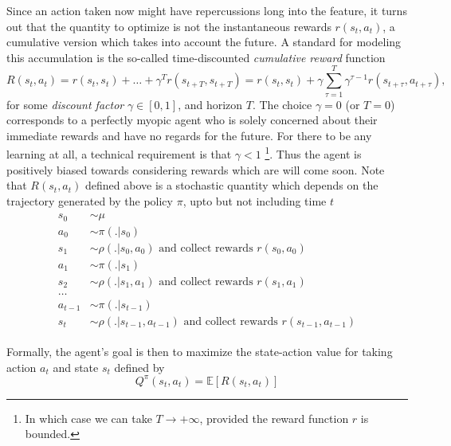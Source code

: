 \documentclass{article} %
\begin{document}
Since an action taken now might have repercussions long into the feature, it turns out that the
quantity to optimize is not the instantaneous rewards $r(s_t, a_t)$, a cumulative version which
takes into account the future. A standard for modeling this accumulation is the so-called
time-discounted \textit{cumulative reward} function
\begin{equation}
  \label{eq:cumr}
  R(s_t, a_t) = r(s_t, s_t) + \ldots + \gamma^Tr(s_{t+T}, s_{t+T})
  = r(s_t, s_t) + \gamma \sum_{\tau=1}^{T}\gamma^{\tau-1}r(s_{t+\tau},a_{t+\tau}),
  \end{equation}
for some \textit{discount factor} $\gamma \in [0, 1]$, and horizon $T$. The choice $\gamma = 0$ (or $T=0$)  corresponds to a perfectly myopic agent who is solely concerned about their immediate rewards and have no regards for the future. For there to be any learning at all, a technical requirement is that $\gamma < 1$ \footnote{In which case we can take $T \rightarrow +\infty$, provided the reward function $r$ is bounded.}.
Thus the agent is positively biased towards considering rewards which are will
come soon. Note that $R(s_t, a_t)$ defined above is a stochastic quantity which depends on the trajectory generated by the policy $\pi$, upto but not including time $t$
\begin{eqnarray*}
  \begin{split}
    s_0 &\sim \mu\\
    a_0 &\sim \pi(.|s_0)\\
    s_1 &\sim \rho(.|s_0,a_0) \text{ and collect rewards }r(s_0, a_0)\\
    a_1 &\sim \pi(.|s_1)\\
    s_2 &\sim \rho(.|s_1,a_1) \text{ and collect rewards }r(s_1, a_1)\\
    \ldots\\
    a_{t-1} &\sim \pi(.|s_{t-1})\\
    s_{t} &\sim \rho(.|s_{t-1},a_{t-1}) \text{ and collect rewards }r(s_{t-1}, a_{t-1})
  \end{split}
\end{eqnarray*}

Formally, the agent's goal is then to maximize the state-action value for
taking action $a_t$ and state $s_t$ defined by
\begin{equation}
  \label{eq:qval}
  Q^{\pi}(s_t,a_t) = \mathbb E [R(s_t, a_t)]
\end{equation}
\end{document}
